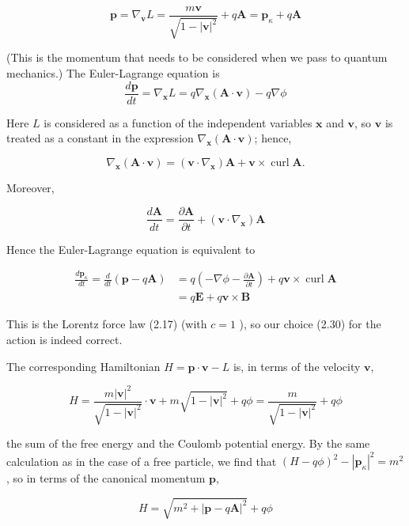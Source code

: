 \documentclass[10pt, letterpaper]{article}
\begin{document}
$$
\mathbf{p}=\nabla_{\mathbf{v}} L=\frac{m \mathbf{v}}{\sqrt{1-|\mathbf{v}|^{2}}}+q \mathbf{A}=\mathbf{p}_{\kappa}+q \mathbf{A}
$$

(This is the momentum that needs to be considered when we pass to quantum mechanics.) The Euler-Lagrange equation is
$$
\frac{d \mathbf{p}}{d t}=\nabla_{\mathbf{x}} L=q \nabla_{\mathbf{x}}(\mathbf{A} \cdot \mathbf{v})-q \nabla \phi
$$

Here $L$ is considered as a function of the independent variables $\mathbf{x}$ and $\mathbf{v}$, so $\mathbf{v}$ is treated as a constant in the expression $\nabla_{\mathbf{x}}(\mathbf{A} \cdot \mathbf{v})$; hence,

$$
\nabla_{\mathbf{x}}(\mathbf{A} \cdot \mathbf{v})=\left(\mathbf{v} \cdot \nabla_{\mathbf{x}}\right) \mathbf{A}+\mathbf{v} \times \operatorname{curl} \mathbf{A} .
$$

Moreover,

$$
\frac{d \mathbf{A}}{d t}=\frac{\partial \mathbf{A}}{\partial t}+\left(\mathbf{v} \cdot \nabla_{\mathbf{x}}\right) \mathbf{A}
$$

Hence the Euler-Lagrange equation is equivalent to

$$
\begin{aligned}
\frac{d \mathbf{p}_{\kappa}}{d t}=\frac{d}{d t}(\mathbf{p}-q \mathbf{A}) & =q\left(-\nabla \phi-\frac{\partial \mathbf{A}}{\partial t}\right)+q \mathbf{v} \times \operatorname{curl} \mathbf{A} \\
& =q \mathbf{E}+q \mathbf{v} \times \mathbf{B}
\end{aligned}
$$

This is the Lorentz force law (2.17) (with $c=1$ ), so our choice (2.30) for the action is indeed correct.

The corresponding Hamiltonian $H=\mathbf{p} \cdot \mathbf{v}-L$ is, in terms of the velocity $\mathbf{v}$,

$$
H=\frac{m|\mathbf{v}|^{2}}{\sqrt{1-|\mathbf{v}|^{2}}} \cdot \mathbf{v}+m \sqrt{1-|\mathbf{v}|^{2}}+q \phi=\frac{m}{\sqrt{1-|\mathbf{v}|^{2}}}+q \phi
$$

the sum of the free energy and the Coulomb potential energy. By the same calculation as in the case of a free particle, we find that $(H-q \phi)^{2}-\left|\mathbf{p}_{\kappa}\right|^{2}=m^{2}$, so in terms of the canonical momentum $\mathbf{p}$,

$$
H=\sqrt{m^{2}+|\mathbf{p}-q \mathbf{A}|^{2}}+q \phi
$$
\end{document}
